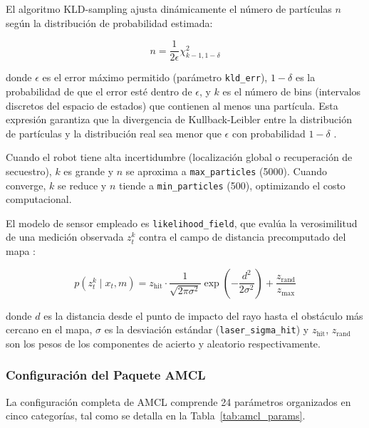 \documentclass[12pt,letterpaper]{article}
\begin{document}
El algoritmo KLD-sampling ajusta dinámicamente el número de partículas $n$ según la distribución de probabilidad estimada:

\begin{equation}
    n = \frac{1}{2\epsilon} \chi^2_{k-1, 1-\delta}
    \label{eq:kld}
\end{equation}

donde $\epsilon$ es el error máximo permitido (parámetro \texttt{kld\_err}), $1-\delta$ es la probabilidad de que el error esté dentro de $\epsilon$, y $k$ es el número de bins (intervalos discretos del espacio de estados) que contienen al menos una partícula. Esta expresión garantiza que la divergencia de Kullback-Leibler entre la distribución de partículas y la distribución real sea menor que $\epsilon$ con probabilidad $1-\delta$ \citep{fox2003adapting}.

Cuando el robot tiene alta incertidumbre (localización global o recuperación de secuestro), $k$ es grande y $n$ se aproxima a \texttt{max\_particles} (5000). Cuando converge, $k$ se reduce y $n$ tiende a \texttt{min\_particles} (500), optimizando el costo computacional.

El modelo de sensor empleado es \texttt{likelihood\_field}, que evalúa la verosimilitud de una medición observada $z_t^k$ contra el campo de distancia precomputado del mapa \citep{thrun2005probabilistic}:

\begin{equation}
    p(z_t^k \mid x_t, m) = z_{\text{hit}} \cdot \frac{1}{\sqrt{2\pi\sigma^2}} \exp\left(-\frac{d^2}{2\sigma^2}\right) + \frac{z_{\text{rand}}}{z_{\text{max}}}
    \label{eq:likelihood}
\end{equation}

donde $d$ es la distancia desde el punto de impacto del rayo hasta el obstáculo más cercano en el mapa, $\sigma$ es la desviación estándar (\texttt{laser\_sigma\_hit}) y $z_{\text{hit}}$, $z_{\text{rand}}$ son los pesos de los componentes de acierto y aleatorio respectivamente.

\subsubsection{Configuración del Paquete AMCL}

La configuración completa de AMCL comprende 24 parámetros organizados en cinco categorías, tal como se detalla en la Tabla~\ref{tab:amcl_params}.
\end{document}
